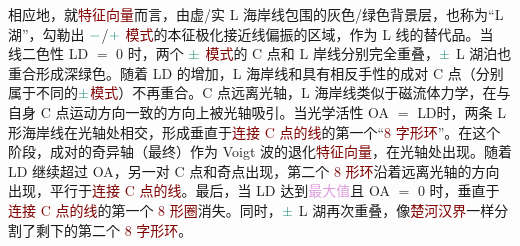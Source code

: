 相应地，就\textcolor{Maroon}{特征向量}而言，由\textcolor{PineGreen}{虚}/\textcolor{PineGreen}{实} \textcolor{PineGreen}{L 海岸线}包围的灰色/绿色背景层，也称为“\textcolor{PineGreen}{L 湖}”，勾勒出 $\textcolor{PineGreen}{-}$/$\textcolor{PineGreen}{+}$ \textcolor{Maroon}{模式}的\textcolor{PineGreen}{本征极化}接近\textcolor{PineGreen}{线偏振}的区域，作为 \textcolor{PineGreen}{L 线}\cite{berryOpticalSingularitiesBirefringent2003}的替代品。当 \textcolor{NavyBlue}{线二色性 LD} $=$ 0 时，两个 $\textcolor{PineGreen}{\pm}$ \textcolor{Maroon}{模式}的 \textcolor{PineGreen}{C 点}和 \textcolor{PineGreen}{L 岸线}分别完全重叠，$\textcolor{PineGreen}{\pm}$ \textcolor{PineGreen}{L 湖泊}也重合形成深绿色。随着 \textcolor{NavyBlue}{LD} 的增加，\textcolor{PineGreen}{L 海岸线}和具有相反\textcolor{NavyBlue}{手性}的成对 \textcolor{PineGreen}{C 点}（分别属于不同的$\textcolor{PineGreen}{\pm}$\textcolor{Maroon}{模式}）不再重合。\textcolor{PineGreen}{C 点}远离\textcolor{PineGreen}{光轴}，\textcolor{PineGreen}{L 海岸线}类似于\textcolor{NavyBlue}{磁流体力学}，在与自身 \textcolor{PineGreen}{C 点}运动方向一致的方向上被\textcolor{PineGreen}{光轴}吸引。当\textcolor{NavyBlue}{光学活性 OA} $=$ \textcolor{NavyBlue}{LD}时，两条 \textcolor{PineGreen}{L 形海岸线}在\textcolor{PineGreen}{光轴}处相交，形成垂直于\textcolor{Maroon}{连接 C 点的线}的第一个“\textcolor{Maroon}{8 字形环}”。在这个阶段，成对的\textcolor{PineGreen}{奇异轴}（最终）作为 \textcolor{PineGreen}{Voigt 波}的\textcolor{PineGreen}{退化}\textcolor{Maroon}{特征向量}，在\textcolor{PineGreen}{光轴}处出现。随着 \textcolor{NavyBlue}{LD} 继续超过 \textcolor{NavyBlue}{OA}，另一对 \textcolor{PineGreen}{C 点}和\textcolor{PineGreen}{奇点}出现，第二个 \textcolor{Maroon}{8 形环}沿着远离\textcolor{PineGreen}{光轴}的方向出现，平行于\textcolor{Maroon}{连接 C 点的线}。最后，当 \textcolor{NavyBlue}{LD} 达到\textcolor{Plum}{最大值}且 \textcolor{NavyBlue}{OA} $=$ 0 时，垂直于\textcolor{Maroon}{连接 C 点的线}的第一个 \textcolor{Maroon}{8 形圈}消失。同时，$\textcolor{PineGreen}{\pm}$ \textcolor{PineGreen}{L 湖}再次重叠，像\textcolor{Maroon}{楚河汉界}一样分割了剩下的第二个 \textcolor{Maroon}{8 字形环}。

